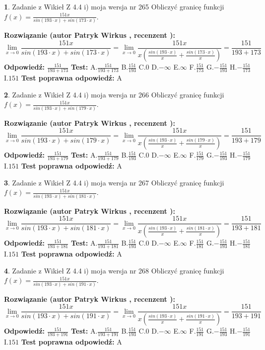 \documentclass[12pt, a4paper]{article}
\theoremstyle{definition} %
\newtheorem{zad}{}
\newcommand{\zadStart}[1]{\begin{zad}#1\newline}
\newcommand{\zadStop}{\end{zad}}
\newcommand{\rozwStart}[2]{\noindent \textbf{Rozwiązanie (autor #1 , recenzent #2): }\newline}
\newcommand{\rozwStop}{\newline}
\newcommand{\odpStart}{\noindent \textbf{Odpowiedź:}\newline}
\newcommand{\odpStop}{\newline}
\newcommand{\testStart}{\noindent \textbf{Test:}\newline}
\newcommand{\testStop}{\newline}
\newcommand{\kluczStart}{\noindent \textbf{Test poprawna odpowiedź:}\newline}
\newcommand{\kluczStop}{\newline}
\begin{document}
\zadStart{Zadanie z Wikieł Z 4.4 i) moja wersja nr 265}
Obliczyć granicę funkcji $f(x)=\frac{151x}{sin(193\cdot x) +sin(173\cdot x)}$.
\zadStop
\rozwStart{Patryk Wirkus}{}
$$\lim\limits_{x\to 0}\frac{151x}{sin(193\cdot x) +sin(173\cdot x)}=\lim\limits_{x\to 0}\frac{151x}{x(\frac{sin(193\cdot x)}{x}+\frac{sin(173\cdot x)}{x})}=\frac{151}{193+173}$$
\rozwStop
\odpStart
$\frac{151}{193+173}$
\odpStop
\testStart
A.$\frac{151}{193+173}$
B.$\frac{151}{193}$
C.$0$
D.$-\infty$
E.$\infty$
F.$\frac{151}{173}$
G.$-\frac{151}{193}$
H.$-\frac{151}{173}$
I.$151$
\testStop
\kluczStart
A
\kluczStop



\zadStart{Zadanie z Wikieł Z 4.4 i) moja wersja nr 266}
Obliczyć granicę funkcji $f(x)=\frac{151x}{sin(193\cdot x) +sin(179\cdot x)}$.
\zadStop
\rozwStart{Patryk Wirkus}{}
$$\lim\limits_{x\to 0}\frac{151x}{sin(193\cdot x) +sin(179\cdot x)}=\lim\limits_{x\to 0}\frac{151x}{x(\frac{sin(193\cdot x)}{x}+\frac{sin(179\cdot x)}{x})}=\frac{151}{193+179}$$
\rozwStop
\odpStart
$\frac{151}{193+179}$
\odpStop
\testStart
A.$\frac{151}{193+179}$
B.$\frac{151}{193}$
C.$0$
D.$-\infty$
E.$\infty$
F.$\frac{151}{179}$
G.$-\frac{151}{193}$
H.$-\frac{151}{179}$
I.$151$
\testStop
\kluczStart
A
\kluczStop



\zadStart{Zadanie z Wikieł Z 4.4 i) moja wersja nr 267}
Obliczyć granicę funkcji $f(x)=\frac{151x}{sin(193\cdot x) +sin(181\cdot x)}$.
\zadStop
\rozwStart{Patryk Wirkus}{}
$$\lim\limits_{x\to 0}\frac{151x}{sin(193\cdot x) +sin(181\cdot x)}=\lim\limits_{x\to 0}\frac{151x}{x(\frac{sin(193\cdot x)}{x}+\frac{sin(181\cdot x)}{x})}=\frac{151}{193+181}$$
\rozwStop
\odpStart
$\frac{151}{193+181}$
\odpStop
\testStart
A.$\frac{151}{193+181}$
B.$\frac{151}{193}$
C.$0$
D.$-\infty$
E.$\infty$
F.$\frac{151}{181}$
G.$-\frac{151}{193}$
H.$-\frac{151}{181}$
I.$151$
\testStop
\kluczStart
A
\kluczStop



\zadStart{Zadanie z Wikieł Z 4.4 i) moja wersja nr 268}
Obliczyć granicę funkcji $f(x)=\frac{151x}{sin(193\cdot x) +sin(191\cdot x)}$.
\zadStop
\rozwStart{Patryk Wirkus}{}
$$\lim\limits_{x\to 0}\frac{151x}{sin(193\cdot x) +sin(191\cdot x)}=\lim\limits_{x\to 0}\frac{151x}{x(\frac{sin(193\cdot x)}{x}+\frac{sin(191\cdot x)}{x})}=\frac{151}{193+191}$$
\rozwStop
\odpStart
$\frac{151}{193+191}$
\odpStop
\testStart
A.$\frac{151}{193+191}$
B.$\frac{151}{193}$
C.$0$
D.$-\infty$
E.$\infty$
F.$\frac{151}{191}$
G.$-\frac{151}{193}$
H.$-\frac{151}{191}$
I.$151$
\testStop
\kluczStart
A
\kluczStop
\end{document}
